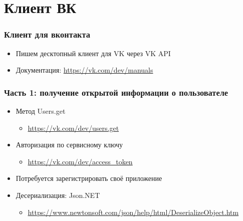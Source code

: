 \documentclass{../../slides-style}
\begin{document}
    \begin{frame}[plain]
        \titlepage
    \end{frame}

    \section{Клиент ВК}

    \begin{frame}
        \frametitle{Клиент для вконтакта}
        \begin{itemize}
            \item Пишем десктопный клиент для VK через VK API
            \item Документация: \url{https://vk.com/dev/manuals}
        \end{itemize}
    \end{frame}

    \begin{frame}
        \frametitle{Часть 1: получение открытой информации о пользователе}
        \begin{itemize}
            \item Метод Users.get
            \begin{itemize}
                \item \url{https://vk.com/dev/users.get}
            \end{itemize}
            \item Авторизация по сервисному ключу
            \begin{itemize}
                \item \url{https://vk.com/dev/access_token}
            \end{itemize}
            \item Потребуется зарегистрировать своё приложение
            \item Десериализация: Json.NET
            \begin{itemize}
                \item \url{https://www.newtonsoft.com/json/help/html/DeserializeObject.htm}
            \end{itemize}
        \end{itemize}
    \end{frame}
\end{document}
